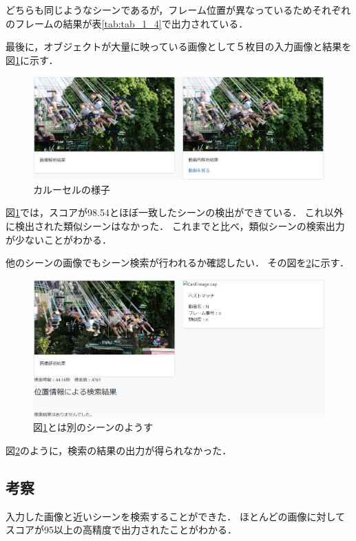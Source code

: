 \documentclass[a4j,12pt,dvipdfmx]{jreport}
\begin{document}
どちらも同じようなシーンであるが，フレーム位置が異なっているためそれぞれのフレームの結果が表\ref{tab:tab_1_4}で出力されている．


最後に，オブジェクトが大量に映っている画像として５枚目の入力画像と結果を図\ref{fig:img_1_5}に示す．
\begin{figure}[H]
  \centering
  \includegraphics[width=13cm]{image/result_1_5.jpg}
  \caption{カルーセルの様子}
  \label{fig:img_1_5}
\end{figure}

図\ref{fig:img_1_5}では，スコアが98.54とほぼ一致したシーンの検出ができている．
これ以外に検出された類似シーンはなかった．
これまでと比べ，類似シーンの検索出力が少ないことがわかる．

他のシーンの画像でもシーン検索が行われるか確認したい．
その図を\ref{fig:img_1_5_1}に示す．
\begin{figure}[H]
  \centering
  \includegraphics[width=13cm]{image/result_1_5_1.jpg}
  \caption{図\ref{fig:img_1_5}とは別のシーンのようす}
  \label{fig:img_1_5_1}
\end{figure}

図\ref{fig:img_1_5_1}のように，検索の結果の出力が得られなかった．

\subsection{考察}\label{chap4-2-1}
入力した画像と近いシーンを検索することができた．
ほとんどの画像に対してスコアが95以上の高精度で出力されたことがわかる．
\end{document}
